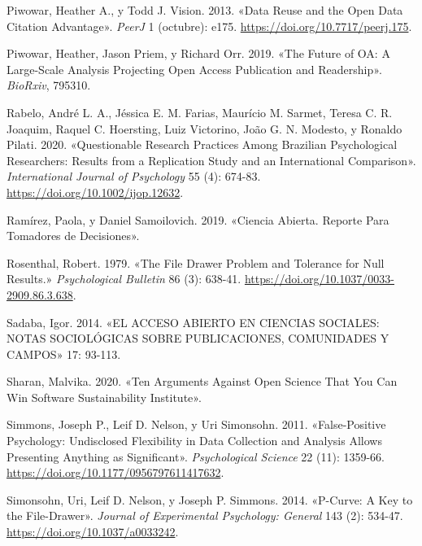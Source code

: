\documentclass[
  spanish,
  letterpaper,
  DIV=11,
  numbers=noendperiod]{scrreprt}
\newlength{\cslhangindent}
\newenvironment{CSLReferences}[2] %
 {\begin{list}{}{%
  \setlength{\itemindent}{0pt}
  \setlength{\leftmargin}{0pt}
  \setlength{\parsep}{0pt}
  \ifodd #1
   \setlength{\leftmargin}{\cslhangindent}
   \setlength{\itemindent}{-1\cslhangindent}
  \fi
  \setlength{\itemsep}{#2\baselineskip}}}
 {\end{list}}
\begin{document}
\begin{CSLReferences}{1}{0}
Piwowar, Heather A., y Todd J. Vision. 2013. {«Data Reuse and the Open
Data Citation Advantage»}. \emph{PeerJ} 1 (octubre): e175.
\url{https://doi.org/10.7717/peerj.175}.

Piwowar, Heather, Jason Priem, y Richard Orr. 2019. {«The {Future} of
{OA}: {A} Large-Scale Analysis Projecting {Open Access} Publication and
Readership»}. \emph{BioRxiv}, 795310.

Rabelo, André L. A., Jéssica E. M. Farias, Maurício M. Sarmet, Teresa C.
R. Joaquim, Raquel C. Hoersting, Luiz Victorino, João G. N. Modesto, y
Ronaldo Pilati. 2020. {«Questionable Research Practices Among
{Brazilian} Psychological Researchers: {Results} from a Replication
Study and an International Comparison»}. \emph{International Journal of
Psychology} 55 (4): 674-83. \url{https://doi.org/10.1002/ijop.12632}.

Ramírez, Paola, y Daniel Samoilovich. 2019. {«Ciencia {Abierta}.
{Reporte Para Tomadores} de {Decisiones}»}.

Rosenthal, Robert. 1979. {«The File Drawer Problem and Tolerance for
Null Results.»} \emph{Psychological Bulletin} 86 (3): 638-41.
\url{https://doi.org/10.1037/0033-2909.86.3.638}.

Sadaba, Igor. 2014. {«{EL ACCESO ABIERTO EN CIENCIAS SOCIALES}: {NOTAS
SOCIOL{Ó}GICAS SOBRE PUBLICACIONES}, {COMUNIDADES Y CAMPOS}»} 17:
93-113.

Sharan, Malvika. 2020. {«Ten {Arguments Against Open Science That You
Can Win} {\textbar} {Software Sustainability Institute}»}.

Simmons, Joseph P., Leif D. Nelson, y Uri Simonsohn. 2011.
{«False-{Positive Psychology}: {Undisclosed Flexibility} in {Data
Collection} and {Analysis Allows Presenting Anything} as
{Significant}»}. \emph{Psychological Science} 22 (11): 1359-66.
\url{https://doi.org/10.1177/0956797611417632}.

Simonsohn, Uri, Leif D. Nelson, y Joseph P. Simmons. 2014. {«P-Curve:
{A} Key to the File-Drawer»}. \emph{Journal of Experimental Psychology:
General} 143 (2): 534-47. \url{https://doi.org/10.1037/a0033242}.


\end{CSLReferences}
\end{document}
